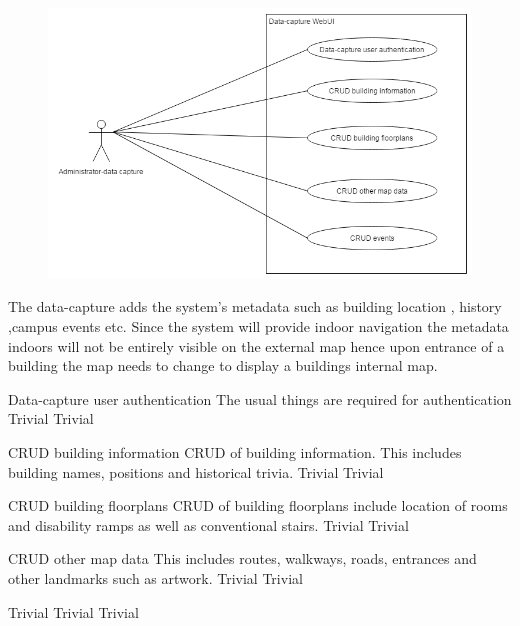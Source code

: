 \begin{figure}[h]
  \includegraphics[width=\textwidth]{diagrams/Specific_Requirements/data_capture_WebUI.png}
\end{figure}

The data-capture adds the system's metadata such as building location , history ,campus events etc. Since the system will provide indoor navigation the metadata indoors will not be entirely visible on the external map hence upon entrance of a building the map needs to change to display a buildings internal map.

\FuncReq
{Data-capture user authentication}
{The usual things are required for authentication}
{Trivial}
{Trivial}

\FuncReq
{CRUD building information}
{CRUD of building information. This includes building names, positions and historical trivia.}
{Trivial}
{Trivial}

\FuncReq
{CRUD building floorplans}
{CRUD of building floorplans include location of rooms and disability ramps as well as conventional stairs.}
{Trivial}
{Trivial}

\FuncReq
{CRUD other map data}
{This includes routes, walkways, roads, entrances and other landmarks such as artwork.}
{Trivial}
{Trivial}
 
{Trivial}
{Trivial}
{Trivial}
